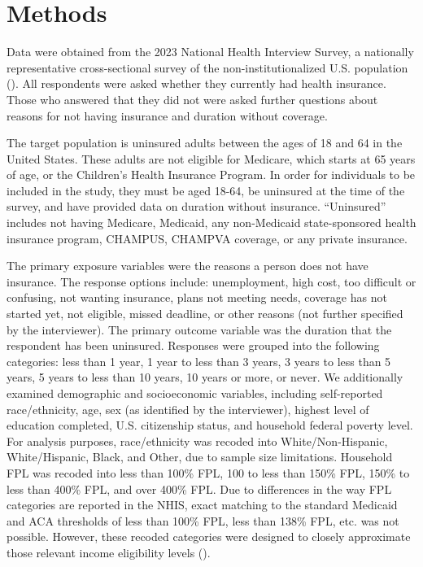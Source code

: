 \documentclass[12pt]{article}
\begin{document}
\newpage
\section{Methods}

Data were obtained from the 2023 National Health Interview Survey, a nationally representative cross-sectional survey of the non-institutionalized U.S. population (\cite{blewett_ipums_2024}). All respondents were asked whether they currently had health insurance. Those who answered that they did not were asked further questions about reasons for not having insurance and duration without coverage.

The target population is uninsured adults between the ages of 18 and 64 in the United States. These adults are not eligible for Medicare, which starts at 65 years of age, or the Children's Health Insurance Program. In order for individuals to be included in the study, they must be aged 18-64, be uninsured at the time of the survey, and have provided data on duration without insurance. “Uninsured” includes not having Medicare, Medicaid, any non-Medicaid state-sponsored health insurance program, CHAMPUS, CHAMPVA coverage, or any private insurance.

The primary exposure variables were the reasons a person does not have insurance. The response options include: unemployment, high cost, too difficult or confusing, not wanting insurance, plans not meeting needs, coverage has not started yet, not eligible, missed deadline, or other reasons (not further specified by the interviewer). The primary outcome variable was the duration that the respondent has been uninsured. Responses were grouped into the following categories: less than 1 year, 1 year to less than 3 years, 3 years to less than 5 years, 5 years to less than 10 years, 10 years or more, or never. We additionally examined demographic and socioeconomic variables, including self-reported race/ethnicity, age, sex (as identified by the interviewer), highest level of education completed, U.S. citizenship status, and household federal poverty level. For analysis purposes, race/ethnicity was recoded into White/Non-Hispanic, White/Hispanic, Black, and Other, due to sample size limitations. Household FPL was recoded into less than 100\% FPL, 100 to less than 150\% FPL, 150\% to less than 400\% FPL, and over 400\% FPL. Due to differences in the way FPL categories are reported in the NHIS, exact matching to the standard Medicaid and ACA thresholds of less than 100\% FPL, less than 138\% FPL, etc. was not possible. However, these recoded categories were designed to closely approximate those relevant income eligibility levels (\cite{us_centers_for_medicare_and_medicaid_services_federal_2025}).
\end{document}
